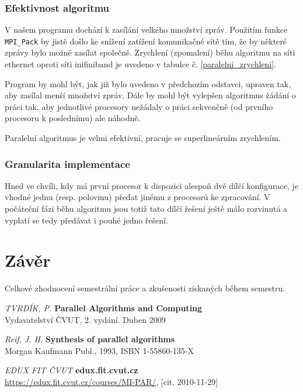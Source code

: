 \documentclass[12pt]{article}
\begin{document}
\subsubsection{Efektivnost algoritmu}
V našem programu dochází k zasílání velkého množství zpráv. Použitím funkce \texttt{MPI\_Pack} by jistě došlo ke snížení zatížení komunikačné sítě tím, že by některé zprávy bylo možné zasílat společně. Zrychlení (zpomalení) běhu algoritmu na síti ethernet oproti síti inifiniband je uvedeno v tabulce č. \ref{paralelni_zrychleni}.

Program by mohl být, jak již bylo uvedeno v předchozím odstavci, upraven tak, aby zasílal menší množství zpráv. Dále by mohl být vylepšen algoritmus žádání o práci tak, aby jednotlivé procesory nežádaly o práci sekvenčně (od prvního procesoru k poslednímu) ale náhodně.

Paralelní algoritmus je velmi efektivní, pracuje se superlineárním zrychlením. 

\subsubsection{Granularita implementace}

Hned ve chvíli, kdy má první procesor k dispozici alespoň dvě dílčí konfigurace, je vhodné jednu (resp. polovinu) předat jinému z procesorů ke zpracování. V počáteční fázi běhu algoritmu jsou totiž tato dílčí řešení ještě málo rozvinutá a vyplatí se tedy předávat i pouhé jedno řešení.

\section{Závěr}

Celkové zhodnocení semestrální práce a zkušenosti získaných během semestru.


\newpage
\begin{thebibliography}{9}


{\em TVRDÍK, P.}
       {\bf Parallel Algorithms and Computing}\\
       Vydavatelství ČVUT, 2. vydání. Duben 2009

{\em Reif, J. H.}
       {\bf Synthesis of parallel algorithms}\\
		Morgan Kaufmann Publ., 1993, ISBN 1-55860-135-X

{\em EDUX FIT ČVUT}
       {\bf edux.fit.cvut.cz}\\
       \url{https://edux.fit.cvut.cz/courses/MI-PAR/}, [cit. 2010-11-29]
       
\end{thebibliography}
\end{document}
